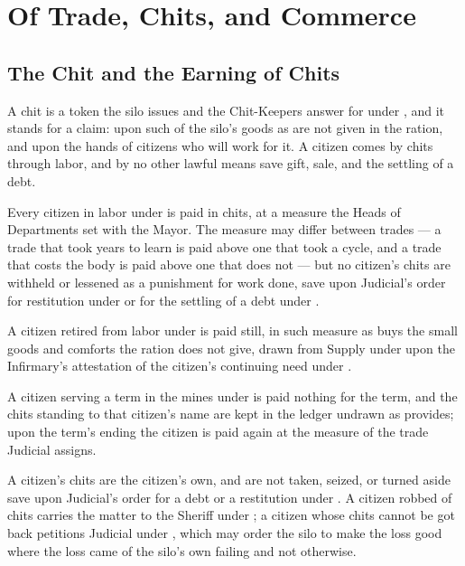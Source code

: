 \chapter{Of Trade, Chits, and Commerce}
\label{art:commerce}


\section{The Chit and the Earning of Chits}
\label{sec:commerce:chit-and-the-earning-of-chits}

A chit is a token the silo issues and the Chit-Keepers answer for under , and it stands for a claim: upon such of the silo's goods as are not given in the ration, and upon the hands of citizens who will work for it. A citizen comes by chits through labor, and by no other lawful means save gift, sale, and the settling of a debt.

\begin{clauses}
\item Every citizen in labor under  is paid in chits, at a measure the Heads of Departments set with the Mayor. The measure may differ between trades --- a trade that took years to learn is paid above one that took a cycle, and a trade that costs the body is paid above one that does not --- but no citizen's chits are withheld or lessened as a punishment for work done, save upon Judicial's order for restitution under  or for the settling of a debt under .
\item A citizen retired from labor under  is paid still, in such measure as buys the small goods and comforts the ration does not give, drawn from Supply under  upon the Infirmary's attestation of the citizen's continuing need under .
\item A citizen serving a term in the mines under  is paid nothing for the term, and the chits standing to that citizen's name are kept in the ledger undrawn as  provides; upon the term's ending the citizen is paid again at the measure of the trade Judicial assigns.
\item A citizen's chits are the citizen's own, and are not taken, seized, or turned aside save upon Judicial's order for a debt or a restitution under . A citizen robbed of chits carries the matter to the Sheriff under ; a citizen whose chits cannot be got back petitions Judicial under , which may order the silo to make the loss good where the loss came of the silo's own failing and not otherwise.
\end{clauses}

